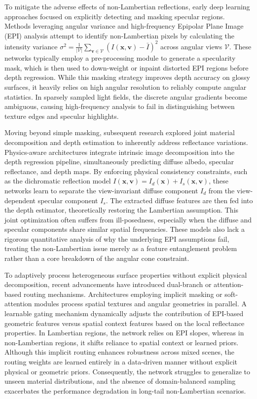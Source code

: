 \documentclass[lettersize,journal]{IEEEtran}
\begin{document}
To mitigate the adverse effects of non-Lambertian reflections, early deep learning approaches focused on explicitly detecting and masking specular regions. Methods leveraging angular variance and high-frequency Epipolar Plane Image (EPI) analysis attempt to identify non-Lambertian pixels by calculating the intensity variance $\sigma^2 = \frac{1}{|\mathcal{V}|} \sum_{\mathbf{v} \in \mathcal{V}} (I(\mathbf{x}, \mathbf{v}) - \bar{I})^2$ across angular views $\mathcal{V}$. These networks typically employ a pre-processing module to generate a specularity mask, which is then used to down-weight or inpaint distorted EPI regions before depth regression. While this masking strategy improves depth accuracy on glossy surfaces, it heavily relies on high angular resolution to reliably compute angular statistics. In sparsely sampled light fields, the discrete angular gradients become ambiguous, causing high-frequency analysis to fail in distinguishing between texture edges and specular highlights.

Moving beyond simple masking, subsequent research explored joint material decomposition and depth estimation to inherently address reflectance variations. Physics-aware architectures integrate intrinsic image decomposition into the depth regression pipeline, simultaneously predicting diffuse albedo, specular reflectance, and depth maps. By enforcing physical consistency constraints, such as the dichromatic reflection model $I(\mathbf{x}, \mathbf{v}) = I_d(\mathbf{x}) + I_s(\mathbf{x}, \mathbf{v})$, these networks learn to separate the view-invariant diffuse component $I_d$ from the view-dependent specular component $I_s$. The extracted diffuse features are then fed into the depth estimator, theoretically restoring the Lambertian assumption. This joint optimization often suffers from ill-posedness, especially when the diffuse and specular components share similar spatial frequencies. These models also lack a rigorous quantitative analysis of why the underlying EPI assumptions fail, treating the non-Lambertian issue merely as a feature entanglement problem rather than a core breakdown of the angular cone constraint.

To adaptively process heterogeneous surface properties without explicit physical decomposition, recent advancements have introduced dual-branch or attention-based routing mechanisms. Architectures employing implicit masking or soft-attention modules process spatial textures and angular geometries in parallel. A learnable gating mechanism dynamically adjusts the contribution of EPI-based geometric features versus spatial context features based on the local reflectance properties. In Lambertian regions, the network relies on EPI slopes, whereas in non-Lambertian regions, it shifts reliance to spatial context or learned priors. Although this implicit routing enhances robustness across mixed scenes, the routing weights are learned entirely in a data-driven manner without explicit physical or geometric priors. Consequently, the network struggles to generalize to unseen material distributions, and the absence of domain-balanced sampling exacerbates the performance degradation in long-tail non-Lambertian scenarios.
\end{document}
